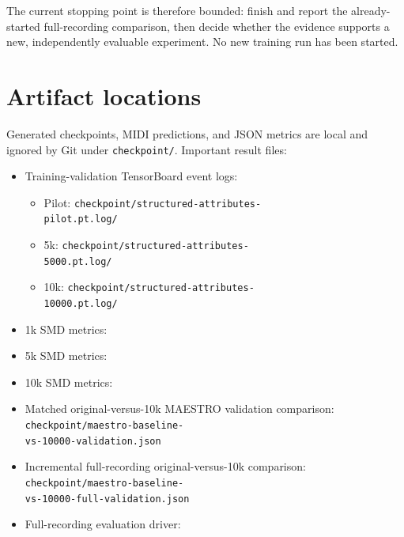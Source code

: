 \documentclass[11pt]{article}
\begin{document}
The current stopping point is therefore bounded: finish and report the
already-started full-recording comparison, then decide whether the evidence
supports a new, independently evaluable experiment. No new training run has
been started.

\section{Artifact locations}

Generated checkpoints, MIDI predictions, and JSON metrics are local and
ignored by Git under \texttt{checkpoint/}. Important result files:

\begin{itemize}
  \item Training-validation TensorBoard event logs:
        \begin{itemize}
          \item Pilot:
                \texttt{checkpoint/structured-attributes-}\\
                \texttt{pilot.pt.log/}
          \item 5k:
                \texttt{checkpoint/structured-attributes-}\\
                \texttt{5000.pt.log/}
          \item 10k:
                \texttt{checkpoint/structured-attributes-}\\
                \texttt{10000.pt.log/}
        \end{itemize}
  \item 1k SMD metrics:
  \item 5k SMD metrics:
  \item 10k SMD metrics:
  \item Matched original-versus-10k MAESTRO validation comparison:
        \\
        \texttt{checkpoint/maestro-baseline-}\\
        \texttt{vs-10000-validation.json}
  \item Incremental full-recording original-versus-10k comparison:
        \\
        \texttt{checkpoint/maestro-baseline-}\\
        \texttt{vs-10000-full-validation.json}
  \item Full-recording evaluation driver:

\end{itemize}
\end{document}
